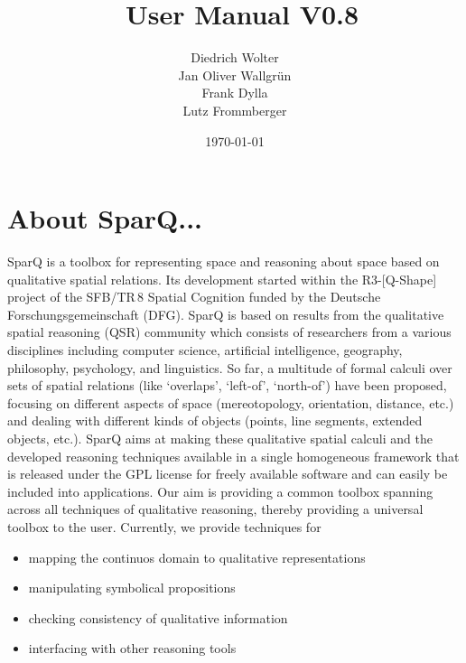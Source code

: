 \documentclass[headsepline]{scrreprt}
\title{\engine\ User Manual V0.8}
\author{Diedrich Wolter\\ Jan Oliver Wallgr{\"u}n \\ Frank Dylla\\ Lutz Frommberger}
\date{\today}
\theoremstyle{definition}
\newcommand{\sfbsc}{SFB/TR\,8 Spatial Cognition}
\newcommand{\qshape}{R3-[Q-Shape]}
\newcommand{\engine}{SparQ}
\begin{document}

\maketitle
\tableofcontents


\chapter*{About SparQ...}


\engine{} is a toolbox for representing space and reasoning about
space based on  qualitative spatial relations. Its development started
within the \qshape{}
project of the \sfbsc{} funded by the Deutsche Forschungsgemeinschaft (DFG).
\engine{} is based on results from the qualitative spatial reasoning (QSR)
community which consists of researchers from a various disciplines
including computer science, artificial intelligence, geography, philosophy,
psychology, and linguistics.
So far, a multitude of formal calculi over sets of
spatial relations (like `overlaps', `left-of',
`north-of') have been proposed, focusing on different
aspects of space (mereotopology, orientation, distance, etc.) and
dealing with different kinds of objects (points, line segments,
extended objects, etc.). \engine{} aims at making these qualitative spatial
calculi and the developed reasoning techniques available in a single
homogeneous framework that is released under the GPL license for freely available software and can easily be included into applications.
Our aim is providing a common toolbox spanning across all techniques of qualitative reasoning, thereby providing a universal toolbox to the user. Currently, we provide techniques for
\begin{itemize}
	\item mapping the continuos domain to qualitative representations
	\item manipulating symbolical propositions
	\item checking consistency of qualitative information
	\item interfacing with other reasoning tools
\end{itemize}
\end{document}
